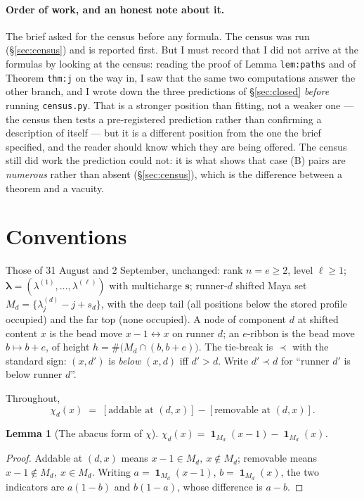 \documentclass[11pt]{article}
\newtheorem{lemma}[theorem]{Lemma}
\theoremstyle{definition}
\theoremstyle{remark}
\newcommand{\bl}{\boldsymbol{\lambda}}
\newcommand{\bs}{\mathbf{s}}
\DeclareMathOperator{\Ind}{\mathbf 1}
\begin{document}
\paragraph{Order of work, and an honest note about it.} The brief asked for the census
before any formula. The census was run (\S\ref{sec:census}) and is reported first. But I
must record that I did not arrive at the formulas by looking at the census: reading the
proof of Lemma \texttt{lem:paths} and of Theorem \texttt{thm:j} on the way in, I saw that
the same two computations answer the other branch, and I wrote down the three predictions
of \S\ref{sec:closed} \emph{before} running \texttt{census.py}. That is a stronger
position than fitting, not a weaker one --- the census then tests a pre-registered
prediction rather than confirming a description of itself --- but it is a different
position from the one the brief specified, and the reader should know which they are
being offered. The census still did work the prediction could not: it is what shows that
case (B) pairs are \emph{numerous} rather than absent (\S\ref{sec:census}), which is the
difference between a theorem and a vacuity.

\section{Conventions}\label{sec:conv}

Those of 31 August and 2 September, unchanged: rank $n=e\ge2$, level $\ell\ge1$;
$\bl=(\lambda^{(1)},\dots,\lambda^{(\ell)})$ with multicharge $\bs$; runner-$d$ shifted
Maya set $M_d=\{\lambda^{(d)}_j-j+s_d\}$, with the deep tail (all positions below the
stored profile occupied) and the far top (none occupied). A node of component $d$ at
shifted content $x$ is the bead move $x-1\leftrightarrow x$ on runner $d$; an $e$-ribbon
is the bead move $b\mapsto b+e$, of height $h=\#\big(M_d\cap(b,b+e)\big)$. The tie-break
is $\prec$ with the standard sign: $(x,d')$ is \emph{below} $(x,d)$ iff $d'>d$. Write
$d'\prec d$ for ``runner $d'$ is below runner $d$''.

Throughout,
\[
\chi_d(x)\;=\;[\text{addable at }(d,x)]-[\text{removable at }(d,x)].
\]

\begin{lemma}[The abacus form of $\chi$]\label{lem:chi}
$\chi_d(x)=\Ind_{M_d}(x-1)-\Ind_{M_d}(x)$.
\end{lemma}
\begin{proof}
Addable at $(d,x)$ means $x-1\in M_d,\ x\notin M_d$; removable means
$x-1\notin M_d,\ x\in M_d$. Writing $a=\Ind_{M_d}(x-1)$, $b=\Ind_{M_d}(x)$, the two
indicators are $a(1-b)$ and $b(1-a)$, whose difference is $a-b$.
\end{proof}
\end{document}
